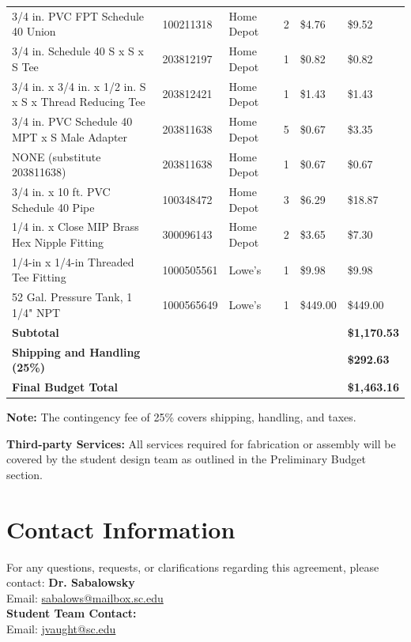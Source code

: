 \documentclass[12pt]{article}
\begin{document}
\begin{tabular}{@{}lllrll@{}}
3/4 in. PVC FPT Schedule 40 Union & 100211318 & Home Depot & 2 & \$4.76 & \$9.52 \\
3/4 in. Schedule 40 S x S x S Tee & 203812197 & Home Depot & 1 & \$0.82 & \$0.82 \\
3/4 in. x 3/4 in. x 1/2 in. S x S x Thread Reducing Tee & 203812421 & Home Depot & 1 & \$1.43 & \$1.43 \\
3/4 in. PVC Schedule 40 MPT x S Male Adapter & 203811638 & Home Depot & 5 & \$0.67 & \$3.35 \\
NONE (substitute 203811638) & 203811638 & Home Depot & 1 & \$0.67 & \$0.67 \\
3/4 in. x 10 ft. PVC Schedule 40 Pipe & 100348472 & Home Depot & 3 & \$6.29 & \$18.87 \\
1/4 in. x Close MIP Brass Hex Nipple Fitting & 300096143 & Home Depot & 2 & \$3.65 & \$7.30 \\
1/4-in x 1/4-in Threaded Tee Fitting & 1000505561 & Lowe's & 1 & \$9.98 & \$9.98 \\
52 Gal. Pressure Tank, 1 1/4" NPT & 1000565649 & Lowe's & 1 & \$449.00 & \$449.00 \\ \midrule
\textbf{Subtotal} & & & & & \textbf{\$1,170.53} \\ \midrule
\textbf{Shipping and Handling (25\%)} & & & & & \textbf{\$292.63} \\ \midrule
\textbf{Final Budget Total} & & & & & \textbf{\$1,463.16} \\ \bottomrule
\end{tabular}

\medskip

\textbf{Note:} The contingency fee of 25\% covers shipping, handling, and taxes.

\bigskip

\textbf{Third-party Services:} All services required for fabrication or assembly will be covered by the student design team as outlined in the Preliminary Budget section.

\normalsize

\newpage

\section*{Contact Information}
For any questions, requests, or clarifications regarding this agreement, please contact:
\newline\newline
\textbf{Dr. Sabalowsky} \\
Email: \href{mailto:sabalows@mailbox.sc.edu}{sabalows@mailbox.sc.edu} \\
\newline
\textbf{Student Team Contact:} \\
Email: \href{mailto:jvaught@sc.edu}{jvaught@sc.edu} \\
\end{document}

